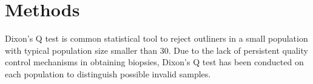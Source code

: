 \chapter{Methods}

Dixon's Q test is common statistical tool to reject outliners in a small population with typical population size smaller than 30. Due to the lack of persistent quality control mechanisms in obtaining biopsies, Dixon's Q test has been conducted on each population to distinguish possible invalid samples. 